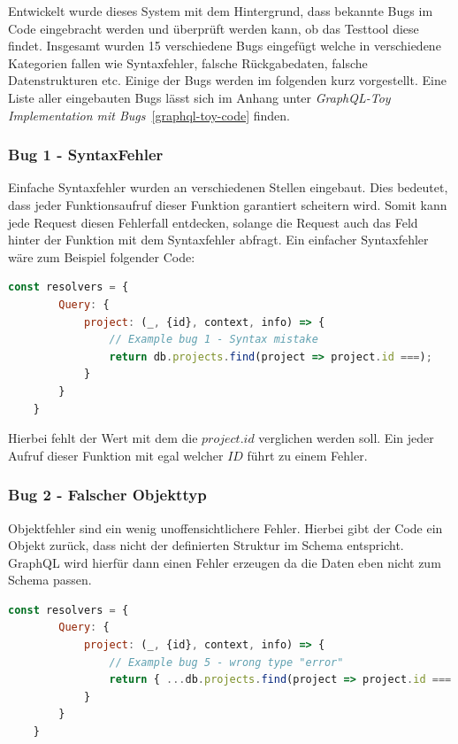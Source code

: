 Entwickelt wurde dieses System mit dem Hintergrund, dass bekannte Bugs im Code eingebracht werden und überprüft werden kann, ob das Testtool diese findet.
Insgesamt wurden 15 verschiedene Bugs eingefügt welche in verschiedene Kategorien fallen wie Syntaxfehler, falsche Rückgabedaten, falsche Datenstrukturen etc.
Einige der Bugs werden im folgenden kurz vorgestellt.
Eine Liste aller eingebauten Bugs lässt sich im Anhang unter \textit{GraphQL-Toy Implementation mit Bugs}~\ref{graphql-toy-code} finden.

\subsubsection{Bug 1 - SyntaxFehler}

Einfache Syntaxfehler wurden an verschiedenen Stellen eingebaut.
Dies bedeutet, dass jeder Funktionsaufruf dieser Funktion garantiert scheitern wird.
Somit kann jede Request diesen Fehlerfall entdecken, solange die Request auch das Feld hinter der Funktion mit dem Syntaxfehler abfragt.
Ein einfacher Syntaxfehler wäre zum Beispiel folgender Code: \\

\begin{lstlisting}[language=javascript]
    const resolvers = {
        Query: {
            project: (_, {id}, context, info) => {
                // Example bug 1 - Syntax mistake
                return db.projects.find(project => project.id ===);
            }
        }
    }
\end{lstlisting}

Hierbei fehlt der Wert mit dem die $project.id$ verglichen werden soll.
Ein jeder Aufruf dieser Funktion mit egal welcher $ID$ führt zu einem Fehler.

\subsubsection{Bug 2 - Falscher Objekttyp}

Objektfehler sind ein wenig unoffensichtlichere Fehler.
Hierbei gibt der Code ein Objekt zurück, dass nicht der definierten Struktur im Schema entspricht.
GraphQL wird hierfür dann einen Fehler erzeugen da die Daten eben nicht zum Schema passen.

\begin{lstlisting}[language=javascript]
    const resolvers = {
        Query: {
            project: (_, {id}, context, info) => {
                // Example bug 5 - wrong type "error"
                return { ...db.projects.find(project => project.id === id), name: ["a", "b"] };
            }
        }
    }
\end{lstlisting}

